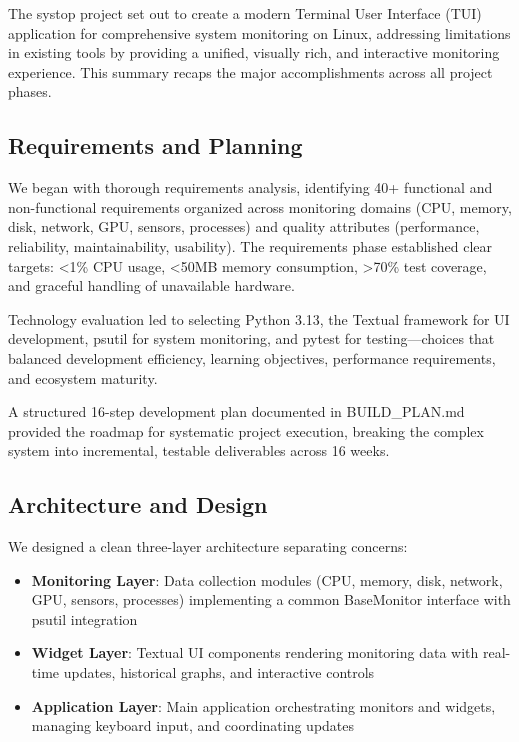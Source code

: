 \documentclass[12pt,a4paper,oneside]{report}
\begin{document}
The systop project set out to create a modern Terminal User Interface (TUI) application for comprehensive system monitoring on Linux, addressing limitations in existing tools by providing a unified, visually rich, and interactive monitoring experience. This summary recaps the major accomplishments across all project phases.

\subsection{Requirements and Planning}

We began with thorough requirements analysis, identifying 40+ functional and non-functional requirements organized across monitoring domains (CPU, memory, disk, network, GPU, sensors, processes) and quality attributes (performance, reliability, maintainability, usability). The requirements phase established clear targets: <1\% CPU usage, <50MB memory consumption, >70\% test coverage, and graceful handling of unavailable hardware.

Technology evaluation led to selecting Python 3.13, the Textual framework for UI development, psutil for system monitoring, and pytest for testing---choices that balanced development efficiency, learning objectives, performance requirements, and ecosystem maturity.

A structured 16-step development plan documented in BUILD\_PLAN.md provided the roadmap for systematic project execution, breaking the complex system into incremental, testable deliverables across 16 weeks.

\subsection{Architecture and Design}

We designed a clean three-layer architecture separating concerns:

\begin{itemize}
    \item \textbf{Monitoring Layer}: Data collection modules (CPU, memory, disk, network, GPU, sensors, processes) implementing a common BaseMonitor interface with psutil integration
    \item \textbf{Widget Layer}: Textual UI components rendering monitoring data with real-time updates, historical graphs, and interactive controls
    \item \textbf{Application Layer}: Main application orchestrating monitors and widgets, managing keyboard input, and coordinating updates
\end{itemize}
\end{document}
